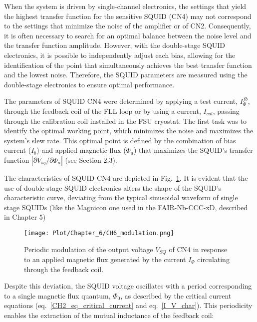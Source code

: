 \documentclass[12pt,a4paper]{report}
\begin{document}
        When the system is driven by single-channel electronics, the settings that yield the highest transfer function for the sensitive SQUID (CN4) may not correspond to the settings that minimize the noise of the amplifier or of CN2. Consequently, it is often necessary to search for an optimal balance between the noise level and the transfer function amplitude. However, with the double-stage SQUID electronics, it is possible to independently adjust each bias, allowing for the identification of the point that simultaneously achieves the best transfer function and the lowest noise. Therefore, the SQUID parameters are measured using the double-stage electronics to ensure optimal performance.
        
        
        The parameters of SQUID CN4 were determined by applying a test current, $I_\Phi^{fb}$, through the feedback coil of the FLL loop or by using a current, $I_{cal}$, passing through the calibration coil installed in the FSU cryostat. The first task was to identify the optimal working point, which minimizes the noise and maximizes the system's slew rate. This optimal point is defined by the combination of bias current ($I_b$) and applied magnetic flux ($\Phi_a$) that maximizes the SQUID's transfer function $|\partial V_{sq}/\partial\Phi_a|$ (see Section 2.3).
        
        The characteristics of SQUID CN4 are depicted in Fig.~\ref{CH6_modulation}. It is evident that the use of double-stage SQUID electronics alters the shape of the SQUID's characteristic curve, deviating from the typical sinusoidal waveform of single stage SQUIDs (like the Magnicon one used in the FAIR-Nb-CCC-xD, described in Chapter 5)
        
        \begin{figure}[H]
        	\centering
        	\texttt{[image: Plot/Chapter\_6/CH6\_modulation.png]}
        	\caption{\small{Periodic modulation of the output voltage $V_{SQ}$ of CN4 in response to an applied magnetic flux generated by the current $I_{\Phi}$ circulating through the feedback coil.}}
        	\label{CH6_modulation}
        \end{figure}
        
        Despite this deviation, the SQUID voltage oscillates with a period corresponding to a single magnetic flux quantum, $\Phi_0$, as described by the critical current equations (eq.~\ref{CH2_eq_critical_current} and eq.~\ref{I_V_char}). This periodicity enables the extraction of the mutual inductance of the feedback coil:
        
\end{document}
